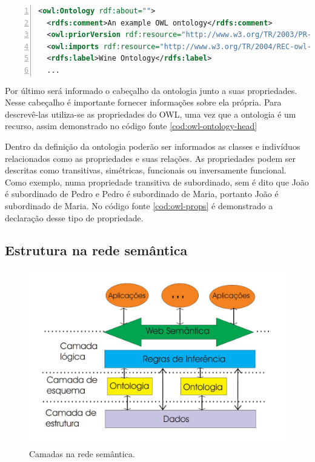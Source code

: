 \begin{lstlisting}[caption=Exemplo do cabeçalho de uma ontologia, language=XML, frame=single, label={cod:owl-ontology-head}, float, numbers=left]
<owl:Ontology rdf:about=""> 
  <rdfs:comment>An example OWL ontology</rdfs:comment>
  <owl:priorVersion rdf:resource="http://www.w3.org/TR/2003/PR-owl-guide-20031215/wine"/> 
  <owl:imports rdf:resource="http://www.w3.org/TR/2004/REC-owl-guide-20040210/food"/> 
  <rdfs:label>Wine Ontology</rdfs:label>
  ...
\end{lstlisting}

Por último será informado o cabeçalho da ontologia junto a suas propriedades. Nesse cabeçalho é importante fornecer informações sobre ela própria. Para descrevê-las utiliza-se as propriedades do OWL, uma vez que a ontologia é um recurso, assim demonstrado no código fonte \ref{cod:owl-ontology-head}

Dentro da definição da ontologia poderão ser informados as classes e indivíduos relacionados como as propriedades e suas relações. As propriedades podem ser descritas como transitivas, simétricas, funcionais ou inversamente funcional. Como exemplo, numa propriedade transitiva de subordinado, sem é dito que João é subordinado de Pedro e Pedro é subordinado de Maria, portanto João é subordinado de Maria. No código fonte \ref{cod:owl-props} é demonstrado a declaração desse tipo de propriedade.

\subsection{Estrutura na rede semântica}

\begin{figure}
	\centering
	\includegraphics[scale=0.35]{imagens/sw_layers.jpg}
	\caption{Camadas na rede semântica. \citep{OWLReport:2005}}
	\label{fig:sw-layers}
\end{figure}

